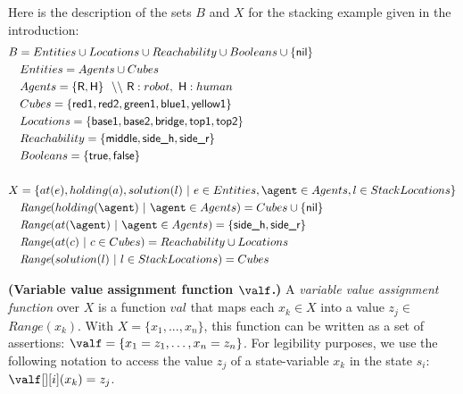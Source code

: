 Here is the description of the sets $B$ and $X$ for the stacking example given in the introduction:
{\small
\begin{align*}
&B           = Entities \cup Locations \cup Reachability \cup Booleans \cup \{\textsf{nil}\} \\
&\quad Entities    = Agents \cup Cubes\\
&\quad Agents      = \{ \textsf{R}, \textsf{H} \} ~~ \backslash\backslash~\textsf{R}:robot,~\textsf{H}:human\\
&\quad Cubes     = \{ \textsf{red1}, \textsf{red2}, \textsf{green1}, \textsf{blue1}, \textsf{yellow1} \}\\
&\quad Locations     = \{ \textsf{base1}, \textsf{base2}, \textsf{bridge}, \textsf{top1}, \textsf{top2} \}\\
&\quad Reachability     = \{ \textsf{middle}, \textsf{side\_h}, \textsf{side\_r} \}\\
&\quad Booleans    = \{ \textsf{true},\textsf{false} \}\\
&\\
&X = \{ at(e), holding(a), solution(l) ~ | ~ e \in Entities, \agent \in Agents, l \in StackLocations\}\\
&\quad \textit{Range}(holding(\agent) ~|~ \agent \in Agents) = Cubes \cup \{\textsf{nil}\} \\
&\quad \textit{Range}(at(\agent) ~|~ \agent \in Agents) = \{ \textsf{side\_h}, \textsf{side\_r} \}\\
&\quad \textit{Range}(at(c) ~|~ c \in Cubes) = Reachability \cup Locations\\
&\quad \textit{Range}(solution(l) ~|~ l \in StackLocations) = Cubes \\
\end{align*}
}



\begin{definition}
    \textbf{(Variable value assignment function $\valf$.)} A \emph{variable value assignment function} over $X$ is a function $val$ that maps each $x_k \in X$ into a value $z_j \in$ $\textit{Range}(x_k)$.
    With $X = \{ x_1, ..., x_n \}$, this function can be written as a set of assertions: $\valf = \{ x_1=z_1, \ldots, x_n=z_n \}$. 
    For legibility purposes, we use the following notation to access the value $z_j$ of a state-variable $x_k$ in the state $s_i$: $\valf[][i](x_k) = z_j$.
    \label{def:variable_value_assignment_function}
\end{definition}



